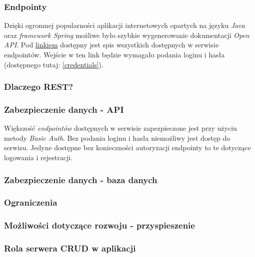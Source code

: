 \subsubsection{Endpointy}
Dzięki ogromnej popularności aplikacji internetowych opartych na języku \textit{Java} oraz \textit{framework Spring} możliwe było szybkie wygenerowanie dokumentacji \textit{Open API}. Pod \href{https://trunk-kartapacjentaservice.herokuapp.com/swagger-ui.html} {linkiem} dostępny jest spis wszystkich dostępnych w serwisie endpointów. Wejście w ten link będzie wymagało podania loginu i hasła (dostępnego tutaj: \ref{credentials}).

\subsubsection{Dlaczego REST?}

\subsubsection{Zabezpieczenie danych - API}
Większość \textit{endpointów} dostępnych w serwisie zapezpieczone jest przy użyciu metody \textit{Basic Auth}. Bez podania loginu i hasła niemożliwy jest dostęp do serwisu. Jedyne dostępne bez konieczności autoryzacji endpointy to te dotyczące logowania i rejestracji.

\subsubsection{Zabezpieczenie danych - baza danych}


\subsubsection{Ograniczenia}
\subsubsection{Możliwości dotyczące rozwoju - przyspieszenie}
\subsubsection{Rola serwera CRUD w aplikacji}
